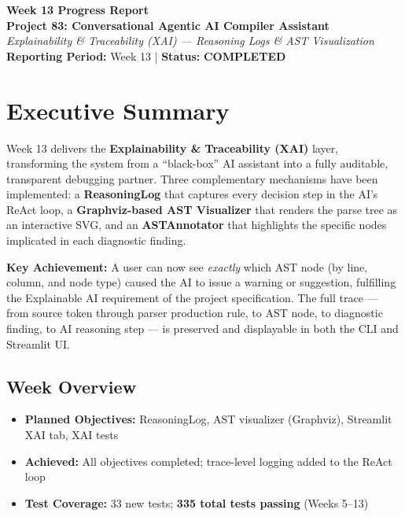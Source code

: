 \documentclass[a4paper,11pt]{article}
\newcommand{\statusgood}[1]{\colorbox{green!20}{\textbf{#1}}}
\begin{document}
\begin{center}
    {\huge \textbf{Week 13 Progress Report}} \\
    \vspace{3mm}
    {\large \textbf{Project 83: Conversational Agentic AI Compiler Assistant}} \\
    \vspace{2mm}
    \textit{Explainability \& Traceability (XAI) --- Reasoning Logs \& AST Visualization} \\
    \vspace{2mm}
    \textbf{Reporting Period:} Week 13 | \textbf{Status:} \statusgood{COMPLETED}
\end{center}

\vspace{5mm}

\section{Executive Summary}

Week 13 delivers the \textbf{Explainability \& Traceability (XAI)} layer, transforming the system from a ``black-box'' AI assistant into a fully auditable, transparent debugging partner. Three complementary mechanisms have been implemented: a \textbf{ReasoningLog} that captures every decision step in the AI's ReAct loop, a \textbf{Graphviz-based AST Visualizer} that renders the parse tree as an interactive SVG, and an \textbf{ASTAnnotator} that highlights the specific nodes implicated in each diagnostic finding.

\textbf{Key Achievement:} A user can now see \textit{exactly} which AST node (by line, column, and node type) caused the AI to issue a warning or suggestion, fulfilling the Explainable AI requirement of the project specification. The full trace — from source token through parser production rule, to AST node, to diagnostic finding, to AI reasoning step — is preserved and displayable in both the CLI and Streamlit UI.

\subsection{Week Overview}
\begin{itemize}[leftmargin=*]
    \item \textbf{Planned Objectives:} ReasoningLog, AST visualizer (Graphviz), Streamlit XAI tab, XAI tests
    \item \textbf{Achieved:} All objectives completed; trace-level logging added to the ReAct loop
    \item \textbf{Test Coverage:} 33 new tests; \textbf{335 total tests passing} (Weeks 5--13)
\end{itemize}
\end{document}
